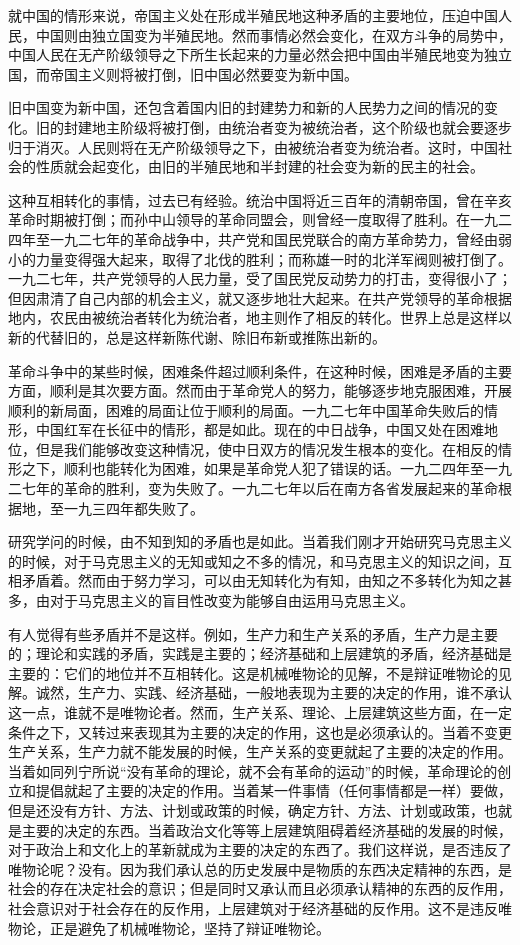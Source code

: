 就中国的情形来说，帝国主义处在形成半殖民地这种矛盾的主要地位，压迫中国人民，中国则由独立国变为半殖民地。然而事情必然会变化，在双方斗争的局势中，中国人民在无产阶级领导之下所生长起来的力量必然会把中国由半殖民地变为独立国，而帝国主义则将被打倒，旧中国必然要变为新中国。

旧中国变为新中国，还包含着国内旧的封建势力和新的人民势力之间的情况的变化。旧的封建地主阶级将被打倒，由统治者变为被统治者，这个阶级也就会要逐步归于消灭。人民则将在无产阶级领导之下，由被统治者变为统治者。这时，中国社会的性质就会起变化，由旧的半殖民地和半封建的社会变为新的民主的社会。

这种互相转化的事情，过去已有经验。统治中国将近三百年的清朝帝国，曾在辛亥革命时期被打倒；而孙中山领导的革命同盟会，则曾经一度取得了胜利。在一九二四年至一九二七年的革命战争中，共产党和国民党联合的南方革命势力，曾经由弱小的力量变得强大起来，取得了北伐的胜利；而称雄一时的北洋军阀则被打倒了。一九二七年，共产党领导的人民力量，受了国民党反动势力的打击，变得很小了；但因肃清了自己内部的机会主义，就又逐步地壮大起来。在共产党领导的革命根据地内，农民由被统治者转化为统治者，地主则作了相反的转化。世界上总是这样以新的代替旧的，总是这样新陈代谢、除旧布新或推陈出新的。

革命斗争中的某些时候，困难条件超过顺利条件，在这种时候，困难是矛盾的主要方面，顺利是其次要方面。然而由于革命党人的努力，能够逐步地克服困难，开展顺利的新局面，困难的局面让位于顺利的局面。一九二七年中国革命失败后的情形，中国红军在长征中的情形，都是如此。现在的中日战争，中国又处在困难地位，但是我们能够改变这种情况，使中日双方的情况发生根本的变化。在相反的情形之下，顺利也能转化为困难，如果是革命党人犯了错误的话。一九二四年至一九二七年的革命的胜利，变为失败了。一九二七年以后在南方各省发展起来的革命根据地，至一九三四年都失败了。

研究学问的时候，由不知到知的矛盾也是如此。当着我们刚才开始研究马克思主义的时候，对于马克思主义的无知或知之不多的情况，和马克思主义的知识之间，互相矛盾着。然而由于努力学习，可以由无知转化为有知，由知之不多转化为知之甚多，由对于马克思主义的盲目性改变为能够自由运用马克思主义。

有人觉得有些矛盾并不是这样。例如，生产力和生产关系的矛盾，生产力是主要的；理论和实践的矛盾，实践是主要的；经济基础和上层建筑的矛盾，经济基础是主要的：它们的地位并不互相转化。这是机械唯物论的见解，不是辩证唯物论的见解。诚然，生产力、实践、经济基础，一般地表现为主要的决定的作用，谁不承认这一点，谁就不是唯物论者。然而，生产关系、理论、上层建筑这些方面，在一定条件之下，又转过来表现其为主要的决定的作用，这也是必须承认的。当着不变更生产关系，生产力就不能发展的时候，生产关系的变更就起了主要的决定的作用。当着如同列宁所说“没有革命的理论，就不会有革命的运动”的时候，革命理论的创立和提倡就起了主要的决定的作用。当着某一件事情（任何事情都是一样）要做，但是还没有方针、方法、计划或政策的时候，确定方针、方法、计划或政策，也就是主要的决定的东西。当着政治文化等等上层建筑阻碍着经济基础的发展的时候，对于政治上和文化上的革新就成为主要的决定的东西了。我们这样说，是否违反了唯物论呢？没有。因为我们承认总的历史发展中是物质的东西决定精神的东西，是社会的存在决定社会的意识；但是同时又承认而且必须承认精神的东西的反作用，社会意识对于社会存在的反作用，上层建筑对于经济基础的反作用。这不是违反唯物论，正是避免了机械唯物论，坚持了辩证唯物论。


